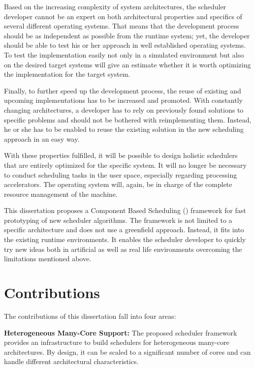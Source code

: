 Based on the increasing complexity of system architectures, the scheduler developer cannot be an expert on both architectural properties and specifics of several different operating systems. That means that the development process should be as independent as possible from the runtime system; yet, the developer should be able to test his or her approach in well established operating systems. To test the implementation easily not only in a simulated environment but also on the desired target systems will give an estimate whether it is worth optimizing the implementation for the target system.

Finally, to further speed up the development process, the reuse of existing and upcoming implementations has to be increased and promoted. With constantly changing architectures, a developer has to rely on previously found solutions to specific problems and should not be bothered with reimplementing them. Instead, he or she has to be enabled to reuse the existing solution in the new scheduling approach in an easy way.

With these properties fulfilled, it will be possible to design holistic schedulers that are entirely optimized for the specific system. It will no longer be necessary to conduct scheduling tasks in the user space, especially regarding processing accelerators. The operating system will, again, be in charge of the complete resource management of the machine.

This dissertation proposes a Component Based Scheduling (\cobas) framework for fast prototyping of new scheduler algorithms. The framework is not limited to a specific architecture and does not use a greenfield approach. Instead, it fits into the existing runtime environments. It enables the scheduler developer to quickly try new ideas both in artificial as well as real life environments overcoming the limitations mentioned above.

\section{Contributions}%
\label{sec:intro:contributions}

The contributions of this dissertation fall into four areas:

\textbf{Heterogeneous Many-Core Support:} The proposed scheduler framework provides an infrastructure to build schedulers for heterogeneous many-core architectures. By design, it can be scaled to a significant number of cores and can handle different architectural characteristics.

